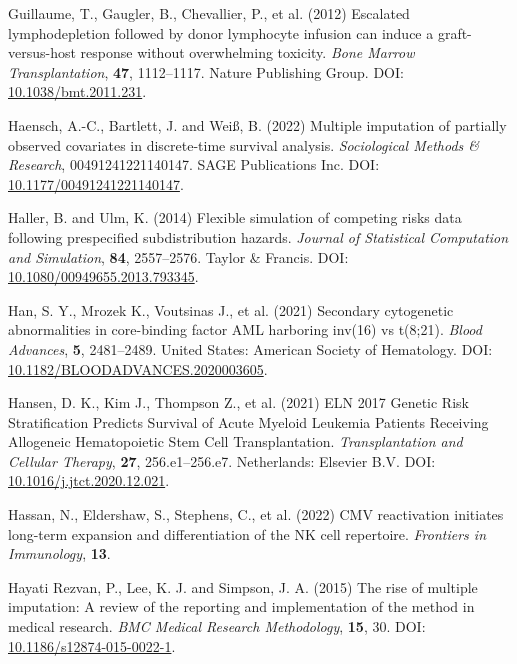 \documentclass[
  letterpaper,
  paper=240mm:170mm,
  twoside=true,
  open=right,
  fontsize=10pt,
  pagesize=false,
  BCOR=15mm,
  DIV=14,
  headinclude=true,
  footinclude=false,
  headsepline=on]{scrbook}
\newlength{\cslhangindent}
\newenvironment{CSLReferences}[2] %
 {\begin{list}{}{%
  \setlength{\itemindent}{0pt}
  \setlength{\leftmargin}{0pt}
  \setlength{\parsep}{0pt}
  \ifodd #1
   \setlength{\leftmargin}{\cslhangindent}
   \setlength{\itemindent}{-1\cslhangindent}
  \fi
  \setlength{\itemsep}{#2\baselineskip}}}
 {\end{list}}
\begin{document}
\begin{CSLReferences}{1}{1}
Guillaume, T., Gaugler, B., Chevallier, P., et al. (2012) Escalated
lymphodepletion followed by donor lymphocyte infusion can induce a
graft-versus-host response without overwhelming toxicity. \emph{Bone
Marrow Transplantation}, \textbf{47}, 1112--1117. Nature Publishing
Group. DOI:
\href{https://doi.org/10.1038/bmt.2011.231}{10.1038/bmt.2011.231}.

Haensch, A.-C., Bartlett, J. and Weiß, B. (2022) Multiple imputation of
partially observed covariates in discrete-time survival analysis.
\emph{Sociological Methods \& Research}, 00491241221140147. SAGE
Publications Inc. DOI:
\href{https://doi.org/10.1177/00491241221140147}{10.1177/00491241221140147}.

Haller, B. and Ulm, K. (2014) Flexible simulation of competing risks
data following prespecified subdistribution hazards. \emph{Journal of
Statistical Computation and Simulation}, \textbf{84}, 2557--2576. Taylor
\& Francis. DOI:
\href{https://doi.org/10.1080/00949655.2013.793345}{10.1080/00949655.2013.793345}.

Han, S. Y., Mrozek K., Voutsinas J., et al. (2021) Secondary cytogenetic
abnormalities in core-binding factor {AML} harboring inv(16) vs t(8;21).
\emph{Blood Advances}, \textbf{5}, 2481--2489. United States: American
Society of Hematology. DOI:
\href{https://doi.org/10.1182/BLOODADVANCES.2020003605}{10.1182/BLOODADVANCES.2020003605}.

Hansen, D. K., Kim J., Thompson Z., et al. (2021) {ELN} 2017 {Genetic
Risk Stratification Predicts Survival} of {Acute Myeloid Leukemia
Patients Receiving Allogeneic Hematopoietic Stem Cell Transplantation}.
\emph{Transplantation and Cellular Therapy}, \textbf{27},
256.e1--256.e7. Netherlands: Elsevier B.V. DOI:
\href{https://doi.org/10.1016/j.jtct.2020.12.021}{10.1016/j.jtct.2020.12.021}.

Hassan, N., Eldershaw, S., Stephens, C., et al. (2022) {CMV}
reactivation initiates long-term expansion and differentiation of the
{NK} cell repertoire. \emph{Frontiers in Immunology}, \textbf{13}.

Hayati Rezvan, P., Lee, K. J. and Simpson, J. A. (2015) The rise of
multiple imputation: A review of the reporting and implementation of the
method in medical research. \emph{BMC Medical Research Methodology},
\textbf{15}, 30. DOI:
\href{https://doi.org/10.1186/s12874-015-0022-1}{10.1186/s12874-015-0022-1}.


\end{CSLReferences}
\end{document}
